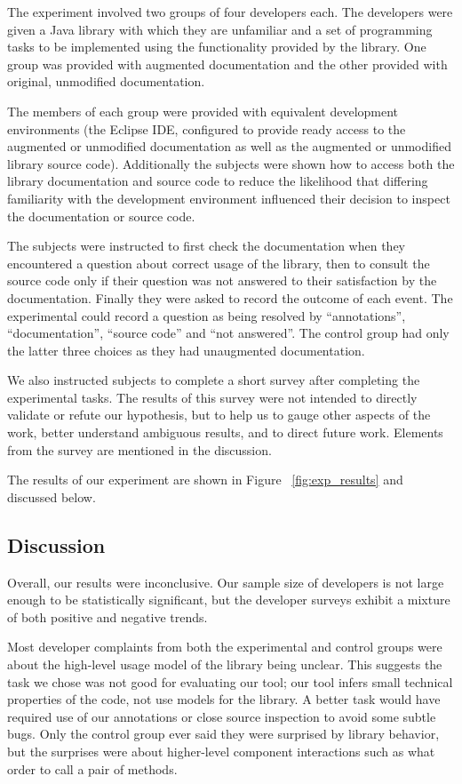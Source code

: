 The experiment involved two groups of four developers each. The developers were
given a Java library with which they are unfamiliar and a set of programming
tasks to be implemented using the functionality provided by the library. One
group was provided with augmented documentation and the other provided with
original, unmodified documentation.

The members of each group were provided with equivalent development
environments (the Eclipse IDE, configured to provide ready access to the
augmented or unmodified documentation as well as the augmented or unmodified
library source code). Additionally the subjects were shown how to access both
the library documentation and source code to reduce the likelihood that
differing familiarity with the development environment influenced their
decision to inspect the documentation or source code.

The subjects were instructed to first check the documentation when they
encountered a question about correct usage of the library, then to consult the
source code only if their question was not answered to their satisfaction by
the documentation. Finally they were asked to record the outcome of each event.
The experimental could record a question as being resolved by ``annotations'',
``documentation'', ``source code'' and ``not answered''. The control group had
only the latter three choices as they had unaugmented documentation.

We also instructed subjects to complete a short survey after completing the
experimental tasks. The results of this survey were not intended to directly
validate or refute our hypothesis, but to help us to gauge other aspects of the
work, better understand ambiguous results, and to direct future work. Elements
from the survey are mentioned in the discussion.

The results of our experiment are shown in Figure ~\ref{fig:exp_results} and
discussed below.

\subsection{Discussion}
Overall, our results were inconclusive.  Our sample size of developers is not
large enough to be statistically significant, but the developer surveys exhibit
a mixture of both positive and negative trends.

Most developer complaints from both the experimental and control groups were
about the high-level usage model of the library being unclear.  This suggests the task we chose was
not good for evaluating our tool; our tool infers small technical
properties of the code, not use models for the library.  A better task would
have required use of our annotations or close source inspection to avoid some
subtle bugs.  Only the control group ever said they were surprised by library
behavior, but the surprises were about higher-level component interactions such
as what order to call a pair of methods.

